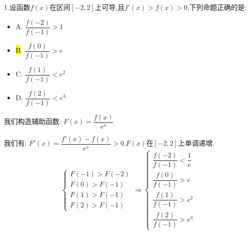 1.设函数$f(x)$在区间$[-2,2]$上可导,且$f'(x)>f(x)>0$,下列命题正确的是:  
\begin{itemize}
	\item A. $\dfrac{f(-2)}{f(-1)}>1$
	\item \hl{B}. $\dfrac{f(0)}{f(-1)}>e$
	\item C. $\dfrac{f(1)}{f(-1)}<e^2$
	\item D. $\dfrac{f(2)}{f(-1)}<e^3$
\end{itemize}
\begin{solution}

	我们构造辅助函数:  $F(x)=\dfrac{f(x)}{e^x}$
	
	我们有:  $F'(x)=\dfrac{f'(x)-f(x)}{e^x}>0$,$F(x)$在$[-2,2]$上单调递增.
	$$\left\lbrace
	\begin{array}{l}
		F(-1)>F(-2)\\
		F(0)>F(-1)\\
		F(1)>F(-1)\\
		F(2)>F(-1)
	\end{array}
	\right. \Rightarrow \left\lbrace
	\begin{array}{l}
		\dfrac{f(-2)}{f(-1)}<\dfrac{1}{e}\\
		\dfrac{f(0)}{f(-1)}>e\\
		\dfrac{f(1)}{f(-1)}>e^2\\
		\dfrac{f(2)}{f(-1)}>e^3
	\end{array}
	\right. $$
\end{solution}

